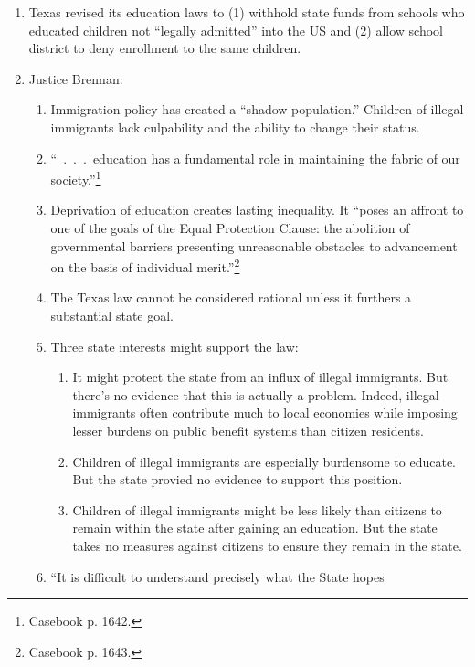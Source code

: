 \begin{enumerate}
    \item Texas revised its education laws to (1) withhold state funds from 
    schools who educated children not ``legally admitted'' into the US and (2) 
    allow school district to deny enrollment to the same children.
    \item Justice Brennan:
    \begin{enumerate}
        \item Immigration policy has created a ``shadow population.'' Children 
        of illegal immigrants lack culpability and the ability to change their 
        status.
        \item ``~.~.~.~education has a fundamental role in maintaining the 
        fabric of our society.''\footnote{Casebook p. 1642.}
        \item Deprivation of education creates lasting inequality. It ``poses 
        an affront to one of the goals of the Equal Protection Clause: the 
        abolition of governmental barriers presenting unreasonable obstacles 
        to advancement on the basis of individual merit.''\footnote{Casebook 
        p. 1643.}
        \item The Texas law cannot be considered rational unless it furthers a 
        substantial state goal.
        \item Three state interests might support the law:
        \begin{enumerate}
            \item It might protect the state from an influx of illegal 
            immigrants. But there's no evidence that this is actually a 
            problem. Indeed, illegal immigrants often contribute much to local 
            economies while imposing lesser burdens on public benefit systems 
            than citizen residents.
            \item Children of illegal immigrants are especially burdensome to 
            educate. But the state provied no evidence to support this 
            position.
            \item Children of illegal immigrants might be less likely than 
            citizens to remain within the state after gaining an education. 
            But the state takes no measures against citizens to ensure they 
            remain in the state.
        \end{enumerate}
        \item ``It is difficult to understand precisely what the State hopes 

\end{enumerate}
\end{enumerate}

